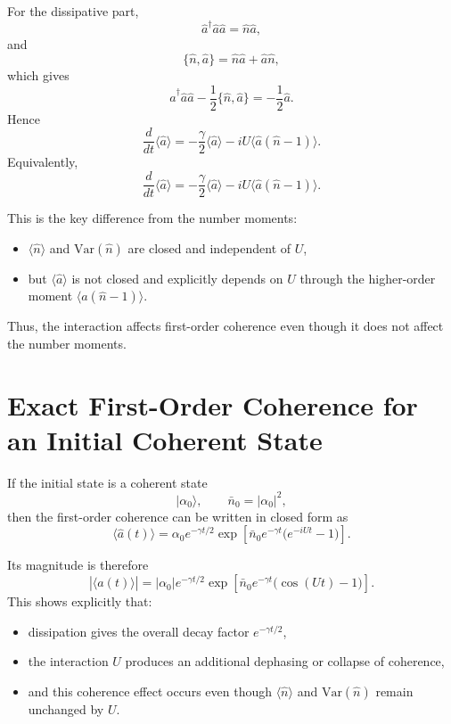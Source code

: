 \documentclass[12pt]{article}
\begin{document}
For the dissipative part,
\[
\hat a^\dagger \hat a \hat a = \hat n \hat a,
\]
and
\[
\{\hat n,\hat a\} = \hat n\hat a + \hat a\hat n,
\]
which gives
\[
\hat a^\dagger \hat a \hat a - \frac{1}{2}\{\hat n,\hat a\}
= -\frac{1}{2}\hat a.
\]
Hence
\[
\frac{d}{dt}\langle \hat a\rangle
= -\frac{\gamma}{2}\langle \hat a\rangle
- iU\langle \hat a(\hat n-1)\rangle.
\]
Equivalently,
\[
\boxed{
\frac{d}{dt}\langle \hat a\rangle
= -\frac{\gamma}{2}\langle \hat a\rangle
- iU\langle \hat a(\hat n-1)\rangle.
}
\]

This is the key difference from the number moments:
\begin{itemize}
\item $\langle \hat n\rangle$ and $\mathrm{Var}(\hat n)$ are closed and independent of $U$,
\item but $\langle \hat a\rangle$ is not closed and explicitly depends on $U$ through the higher-order moment $\langle \hat a(\hat n-1)\rangle$.
\end{itemize}

Thus, the interaction affects first-order coherence even though it does not affect the number moments.

\section*{Exact First-Order Coherence for an Initial Coherent State}
If the initial state is a coherent state
\[
|\alpha_0\rangle,
\qquad
\bar n_0 = |\alpha_0|^2,
\]
then the first-order coherence can be written in closed form as
\[
\boxed{
\langle \hat a(t)\rangle
=
\alpha_0 e^{-\gamma t/2}
\exp\!\left[
\bar n_0 e^{-\gamma t}\bigl(e^{-iUt}-1\bigr)
\right].
}
\]

Its magnitude is therefore
\[
\left|\langle \hat a(t)\rangle\right|
=
|\alpha_0| e^{-\gamma t/2}
\exp\!\left[
\bar n_0 e^{-\gamma t}\bigl(\cos(Ut)-1\bigr)
\right].
\]
This shows explicitly that:
\begin{itemize}
\item dissipation gives the overall decay factor $e^{-\gamma t/2}$,
\item the interaction $U$ produces an additional dephasing or collapse of coherence,
\item and this coherence effect occurs even though $\langle \hat n\rangle$ and $\mathrm{Var}(\hat n)$ remain unchanged by $U$.
\end{itemize}
\end{document}
